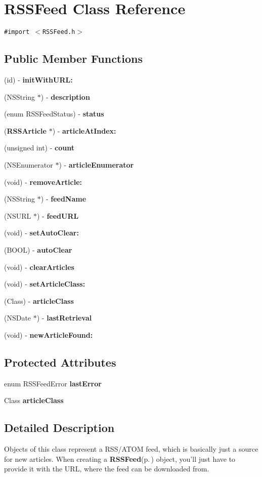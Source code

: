 \section{RSSFeed Class Reference}
\label{classRSSFeed}
{\tt \#import $<$RSSFeed.h$>$}

\subsection*{Public Member Functions}
\begin{CompactItemize}
\item 
(id) - {\bf init\-With\-URL:}
\item 
(NSString $\ast$) - {\bf description}
\item 
(enum RSSFeed\-Status) - {\bf status}
\item 
({\bf RSSArticle} $\ast$) - {\bf article\-At\-Index:}
\item 
(unsigned int) - {\bf count}
\item 
(NSEnumerator $\ast$) - {\bf article\-Enumerator}
\item 
(void) - {\bf remove\-Article:}
\item 
(NSString $\ast$) - {\bf feed\-Name}
\item 
(NSURL $\ast$) - {\bf feed\-URL}
\item 
(void) - {\bf set\-Auto\-Clear:}
\item 
(BOOL) - {\bf auto\-Clear}
\item 
(void) - {\bf clear\-Articles}
\item 
(void) - {\bf set\-Article\-Class:}
\item 
(Class) - {\bf article\-Class}
\item 
(NSDate $\ast$) - {\bf last\-Retrieval}
\item 
(void) - {\bf new\-Article\-Found:}
\end{CompactItemize}
\subsection*{Protected Attributes}
\begin{CompactItemize}
\item 
enum RSSFeed\-Error {\bf last\-Error}
\item 
Class {\bf article\-Class}
\end{CompactItemize}


\subsection{Detailed Description}
Objects of this class represent a RSS/ATOM feed, which is basically just a source for new articles. When creating a {\bf RSSFeed}{\rm (p.\,\pageref{classRSSFeed})} object, you'll just have to provide it with the URL, where the feed can be downloaded from.

